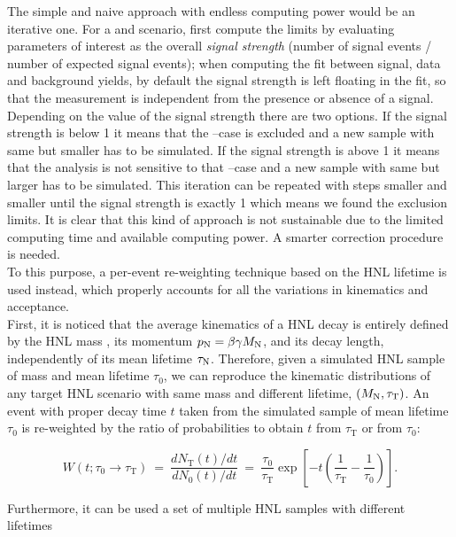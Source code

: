 The simple and naive approach with endless computing power would be an
iterative one. For a \mhnl
and \mixpar scenario, first compute the limits by evaluating parameters
of interest as the overall \emph{signal strength} (number of signal events /
number of expected signal events); when computing the fit between
signal, data and background yields, by default the signal strength is
left floating in the fit, so that the measurement is independent from the
presence or absence of a signal. Depending on the value of the signal
strength there are two options. If the signal strength is below 1 it
means that the \mhnl --\mixpar case is excluded and a new sample with
same \mhnl but smaller \mixpar has to be simulated. If the signal strength is above 1 it
means that the analysis is not sensitive to that \mhnl --\mixpar case and a new sample with
same \mhnl but larger \mixpar has to be simulated. This iteration can
be repeated with steps smaller and smaller until the signal strength is
exactly 1 which means we found the exclusion limits. It is clear that
this kind of approach is not sustainable due to the limited computing
time and available computing power. A smarter correction procedure is needed.\\
To this purpose, a per-event re-weighting technique
based on the HNL lifetime is used instead, which properly accounts for all the
variations in kinematics and acceptance.\\
First, it is noticed that the average kinematics of a HNL decay
is entirely defined by the HNL mass \mhnl, its momentum
$p_\mathrm{N}=\beta\gamma M_{\mathrm{N}}$, and its decay length,
independently of its mean lifetime $\tau_\mathrm{N}$.
Therefore, given a simulated HNL sample of mass \mhnl
and mean lifetime $\tau_0$, we can reproduce the kinematic
distributions of any target HNL scenario with same mass and 
different lifetime, $(M_{\mathrm{N}}, \tau_{\mathrm T})$.
An event with proper decay time $t$ taken from the simulated sample
of mean lifetime $\tau_0$ is re-weighted by the ratio of
probabilities to obtain $t$ from $\tau_{\mathrm T}$ or from $\tau_0$:
\begin{linenomath}
  \begin{equation}
    W(t; \tau_0\to\tau_{\mathrm T}) ~=~ \frac{dN_{\mathrm T}(t)/dt}{dN_0(t)/dt} ~=~
    \frac{\tau_0}{\tau_{\mathrm T}}\exp{\left[-t\left(\frac{1}{\tau_{\mathrm T}}-\frac{1}{\tau_0}\right)\right]}.
  \label{eq:ctauReweightingSingle}
  \end{equation}
\end{linenomath}
Furthermore, it can be used a set of multiple HNL samples with different lifetimes
